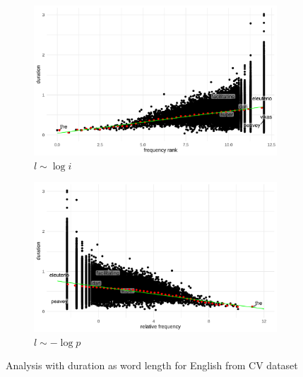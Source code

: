 \begin{figure}[H]
  \centering
  \begin{subfigure}[b]{0.48\textwidth}
    \centering
    \includegraphics[width=\textwidth]{plots/English_logi_d_CV.pdf}
    \caption{$l \sim \log i$}
  \end{subfigure}
  \hfill
  \begin{subfigure}[b]{0.48\textwidth}
    \centering
    \includegraphics[width=\textwidth]{plots/English_logp_d_CV.pdf}
    \caption{$l \sim -\log p$}
  \end{subfigure}
  \caption{Analysis with duration as word length for English from CV dataset}
\end{figure}

